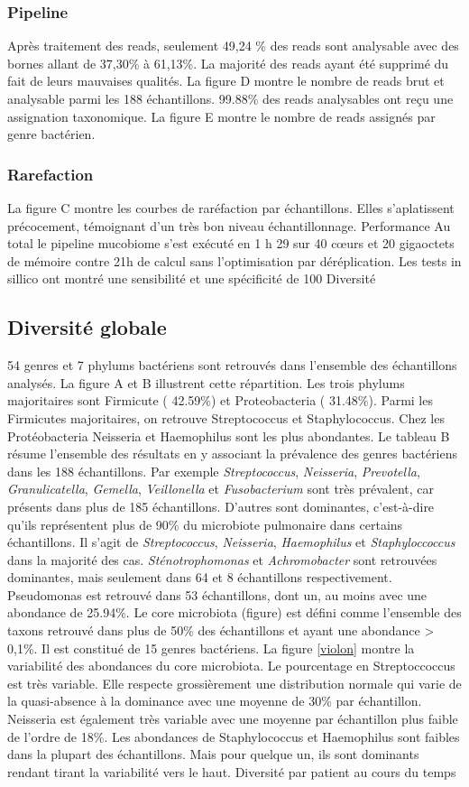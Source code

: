 \documentclass[12pt,a4paper]{article}
\begin{document}
\subsubsection{Pipeline}
Après traitement des reads, seulement 49,24 \% des reads sont analysable avec des bornes allant de 37,30\% à 61,13\%. La majorité des reads ayant été supprimé du fait de leurs mauvaises qualités.
La figure D montre le nombre de reads brut et analysable parmi les 188 échantillons.
99.88\% des reads analysables ont reçu une assignation taxonomique. La figure E montre le nombre de reads assignés par genre bactérien.
\subsubsection{Rarefaction}
La figure C montre les courbes de raréfaction par échantillons.
Elles s’aplatissent précocement, témoignant d’un très bon niveau échantillonnage.
Performance
Au total le pipeline mucobiome s’est exécuté en 1 h 29 sur 40 cœurs et 20 gigaoctets de mémoire contre 21h de calcul sans l’optimisation par déréplication.
Les tests in sillico ont montré une sensibilité et une spécificité de 100%
Diversité
\subsection{Diversité globale}
54 genres et 7 phylums bactériens sont retrouvés dans l’ensemble des échantillons analysés. La figure A et B illustrent cette répartition.
Les trois phylums majoritaires sont Firmicute ( 42.59\%) et Proteobacteria ( 31.48\%). Parmi les Firmicutes majoritaires, on retrouve Streptococcus et Staphylococcus. Chez les Protéobacteria Neisseria et Haemophilus sont les plus abondantes.
Le tableau B résume l’ensemble des résultats en y associant la prévalence des genres bactériens dans les 188 échantillons.
Par exemple \textit{Streptococcus}, \textit{Neisseria}, \textit{Prevotella}, \textit{Granulicatella}, \textit{Gemella}, \textit{Veillonella} et \textit{Fusobacterium} sont très prévalent, car présents dans plus de 185 échantillons.
D’autres sont dominantes, c’est-à-dire qu’ils représentent plus de 90\% du microbiote pulmonaire dans certains échantillons. Il s’agit de \textit{Streptococcus}, \textit{Neisseria}, \textit{Haemophilus} et \textit{Staphyloccoccus} dans la majorité des cas. \textit{Sténotrophomonas} et \textit{Achromobacter} sont retrouvées dominantes, mais seulement dans 64 et 8 échantillons respectivement. Pseudomonas est retrouvé dans 53 échantillons, dont un, au moins avec une abondance de 25.94\%.
Le core microbiota (figure) est défini comme l’ensemble des taxons retrouvé dans plus de 50\% des échantillons et ayant une abondance > 0,1\%. Il est constitué de 15 genres bactériens.
La figure \ref{violon} montre la variabilité des abondances du core microbiota. Le pourcentage en Streptoccoccus est très variable. Elle respecte grossièrement une distribution normale qui varie de la quasi-absence à la dominance avec une moyenne de 30\% par échantillon.
Neisseria est également très variable avec une moyenne par échantillon plus faible de l’ordre de 18\%.
Les abondances de Staphylococcus et Haemophilus sont faibles dans la plupart des échantillons. Mais pour quelque un, ils sont dominants rendant tirant la variabilité vers le haut.
Diversité par patient au cours du temps
\end{document}
